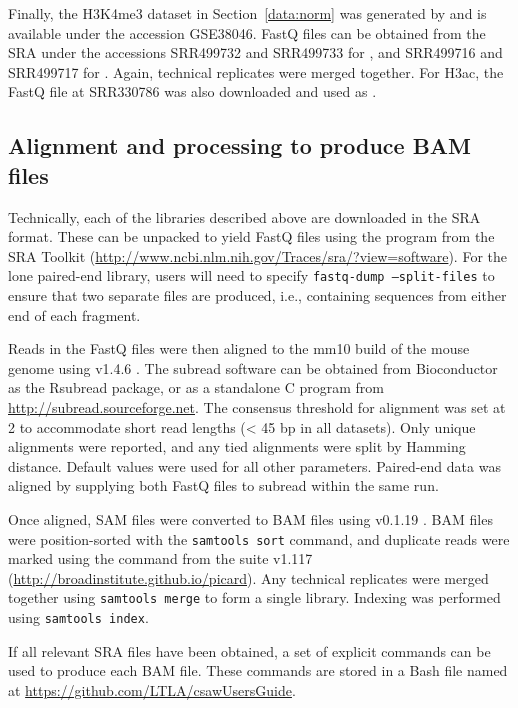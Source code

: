 \documentclass{report}\usepackage[]{graphicx}\usepackage[usenames,dvipsnames]{color}
\begin{document}
Finally, the H3K4me3 dataset in Section~\ref{data:norm} was generated by \cite{domingo2012} and is available under the accession GSE38046. 
FastQ files can be obtained from the SRA under the accessions SRR499732 and SRR499733 for , and SRR499716 and SRR499717 for . 
Again, technical replicates were merged together.
For H3ac, the FastQ file at SRR330786 was also downloaded and used as .
 
\subsection{Alignment and processing to produce BAM files}
Technically, each of the libraries described above are downloaded in the SRA format. 
These can be unpacked to yield FastQ files using the  program from the SRA Toolkit (\url{http://www.ncbi.nlm.nih.gov/Traces/sra/?view=software}). 
For the lone paired-end library, users will need to specify \texttt{fastq-dump --split-files} to ensure that two separate files are produced, i.e., containing sequences from either end of each fragment.

Reads in the FastQ files were then aligned to the mm10 build of the mouse genome using  v1.4.6 \cite{liao2013}. 
The subread software can be obtained from Bioconductor as the Rsubread package, or as a standalone C program from \url{http://subread.sourceforge.net}. 
The consensus threshold for alignment was set at 2 to accommodate short read lengths (\textless{} 45 bp in all datasets).
Only unique alignments were reported, and any tied alignments were split by Hamming distance.
Default values were used for all other parameters.
Paired-end data was aligned by supplying both FastQ files to subread within the same run.

Once aligned, SAM files were converted to BAM files using  v0.1.19 \cite{li2009}. 
BAM files were position-sorted with the \texttt{samtools sort} command, and duplicate reads were marked using the  command from the  suite v1.117 (\url{http://broadinstitute.github.io/picard}).
Any technical replicates were merged together using \texttt{samtools merge} to form a single library. 
Indexing was performed using \texttt{samtools index}.

If all relevant SRA files have been obtained, a set of explicit commands can be used to produce each BAM file.
These commands are stored in a Bash file named  at \url{https://github.com/LTLA/csawUsersGuide}.
\end{document}
